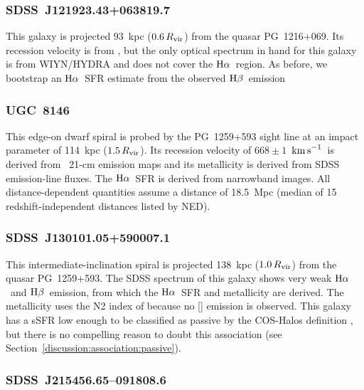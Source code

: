 \documentclass[twocolumn,twocolappendix,tighten,times]{aastex6}
\newcommand{\HI}{\ion{H}{1}}
\newcommand{\OIII}{\ion{O}{3}}
\newcommand{\Ha}{\ensuremath{{\rm H}\alpha}}
\newcommand{\Hb}{\ensuremath{{\rm H}\beta}}
\newcommand{\kms}{\ensuremath{{\rm km\,s}^{-1}}}
\begin{document}
\subsubsection{SDSS~J121923.43+063819.7}
\label{indiv:galaxies:sdssj1219+06b}

This galaxy is projected 93~kpc ($0.6\,R_{\rm vir}$) from the quasar PG~1216+069.
Its recession velocity is from \citet{prochaska11b}, but the only optical spectrum 
in hand for this galaxy is from WIYN/HYDRA and does not cover the \Ha\ region. 
As before, we bootstrap an \Ha\ SFR estimate from the observed \Hb\ emission 


\subsubsection{UGC~8146}
\label{indiv:galaxies:ugc8146}

This edge-on dwarf spiral is probed by the PG~1259+593 sight line at an impact
parameter of 114~kpc ($1.5\,R_{\rm vir}$). Its recession velocity of 
$668\pm1$~\kms\ is derived from \HI\ 21-cm emission maps \citep{springob05}
and its metallicity is derived from SDSS emission-line fluxes. The \Ha\ SFR is 
derived from narrowband images. All distance-dependent quantities assume a 
distance of 18.5~Mpc (median of 15 redshift-independent distances listed by NED).


\subsubsection{SDSS~J130101.05+590007.1}
\label{indiv:galaxies:sdssj1301+59}

This intermediate-inclination spiral is projected 138~kpc ($1.0\,R_{\rm vir}$) 
from the quasar PG~1259+593. The SDSS spectrum of this galaxy shows very weak 
\Ha\ and \Hb\ emission, from which the \Ha\ SFR and metallicity are derived. 
The metallicity uses the N2 index of \citet{pettini04} because no [\OIII] 
emission is observed. This galaxy has a sSFR low enough to be classified as 
passive by the COS-Halos definition 
\citep[$<10^{-11}~{\rm yr}^{-1}$;][]{tumlinson11}, but there is no compelling 
reason to doubt this association (see Section~\ref{discussion:association:passive}).


\subsubsection{SDSS~J215456.65--091808.6}
\label{indiv:galaxies:sdssj2154-09}
\end{document}
